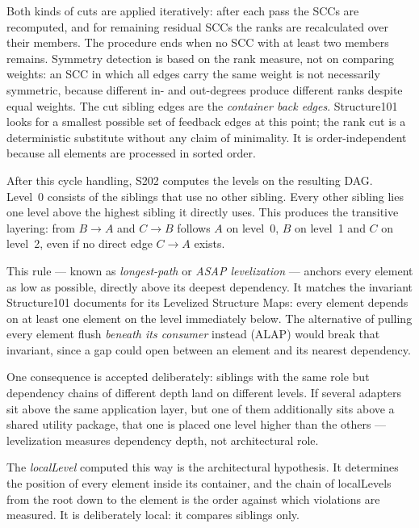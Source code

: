 \documentclass[a4paper,11pt]{article}
\begin{document}
Both kinds of cuts are applied iteratively: after each pass the SCCs are
recomputed, and for remaining residual SCCs the ranks are recalculated over
their members. The procedure ends when no SCC with at least two members
remains. Symmetry detection is based on the rank measure, not on comparing
weights: an SCC in which all edges carry the same weight is not necessarily
symmetric, because different in- and out-degrees produce different ranks
despite equal weights. The cut sibling edges are the \emph{container back
edges}. Structure101 looks for a smallest possible set of feedback edges at
this point; the rank cut is a deterministic substitute without any claim of
minimality. It is order-independent because all elements are processed in
sorted order.

After this cycle handling, S202 computes the levels on the resulting DAG.
Level~0 consists of the siblings that use no other sibling. Every other
sibling lies one level above the highest sibling it directly uses. This
produces the transitive layering: from $B \to A$ and $C \to B$ follows $A$ on
level~0, $B$ on level~1 and $C$ on level~2, even if no direct edge $C \to A$
exists.

This rule — known as \emph{longest-path} or \emph{ASAP levelization} —
anchors every element as low as possible, directly above its deepest
dependency. It matches the invariant Structure101 documents for its Levelized
Structure Maps: every element depends on at least one element on the level
immediately below. The alternative of pulling every element flush
\emph{beneath its consumer} instead (ALAP) would break that invariant, since a
gap could open between an element and its nearest dependency.

One consequence is accepted deliberately: siblings with the same role but
dependency chains of different depth land on different levels. If several
adapters sit above the same application layer, but one of them additionally
sits above a shared utility package, that one is placed one level higher than
the others — levelization measures dependency depth, not architectural role.

The \emph{localLevel} computed this way is the architectural hypothesis. It
determines the position of every element inside its container, and the chain
of localLevels from the root down to the element is the order against which
violations are measured. It is deliberately local: it compares siblings only.
\end{document}
